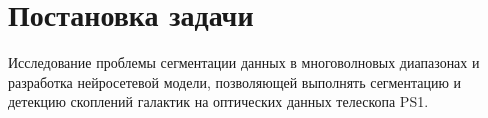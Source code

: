 \chapter{Постановка задачи}
\label{cha:ch_1}

Исследование проблемы сегментации данных в многоволновых диапазонах и разработка нейросетевой 
модели, позволяющей выполнять сегментацию и детекцию скоплений галактик на оптических данных телескопа PS1.\\

